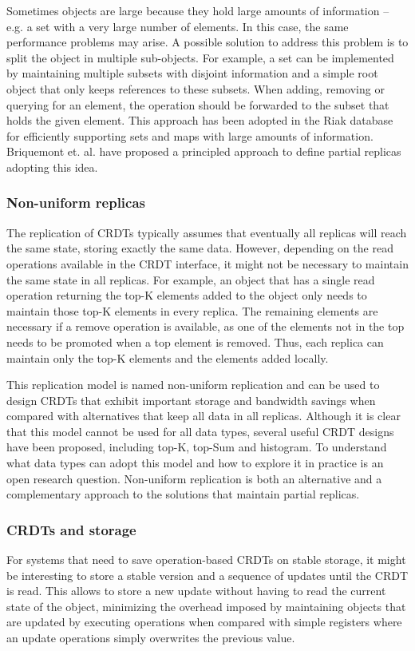\documentclass[11pt,a4paper]{article}
\begin{document}
Sometimes objects are large because they hold large amounts of information -- e.g. 
a set with a very large number of elements. 
In this case, the same performance problems may arise. 
A possible solution to address this problem is to split the object
in multiple sub-objects. For example, a set can be implemented by maintaining
multiple subsets with disjoint information and a simple root object that only keeps
references to these subsets. When adding, removing or querying for an element, the 
operation should be forwarded to the subset that holds the given element.  
This approach has been adopted in the Riak database for efficiently supporting
sets and maps with large amounts of information. 
Briquemont et. al. \cite{Briquemont15Conflict} have proposed a principled approach 
to define partial replicas adopting this idea.

\subsubsection{Non-uniform replicas}
The replication of CRDTs typically assumes that eventually all replicas
will reach the same state, storing exactly the same data.
However, depending on the read operations available in the CRDT interface, 
it might not be necessary to maintain the same state in all replicas.
For example, an object that has a single read operation returning the 
top-K elements added to the object only needs to maintain those top-K elements 
in every replica. 
The remaining elements are necessary if a remove operation is available,
as one of the elements not in the top needs to be promoted when a top element 
is removed. 
Thus, each replica can maintain only the top-K elements and the elements
added locally.

This replication model is named non-uniform replication \cite{Cabrita17Non}
and can be used to design CRDTs that exhibit important storage and bandwidth 
savings when compared with alternatives that keep all data in all replicas.
Although it is clear that this model cannot be used for all data types, 
several useful CRDT designs have been proposed, including top-K, top-Sum and
histogram. To understand what data types can adopt this model and how to 
explore it in practice is an open research question.
Non-uniform replication is both an alternative and a complementary approach 
to the solutions that maintain partial replicas.



\subsubsection{CRDTs and storage}
For systems that need to save operation-based CRDTs on stable storage,
it might be interesting to store a stable version and a sequence of updates
until the CRDT is read. 
This allows to store a new update without having to read the current state of
the object, minimizing the overhead imposed by maintaining objects
that are updated by executing operations when compared with simple registers
where an update operations simply overwrites the previous value.
\end{document}
